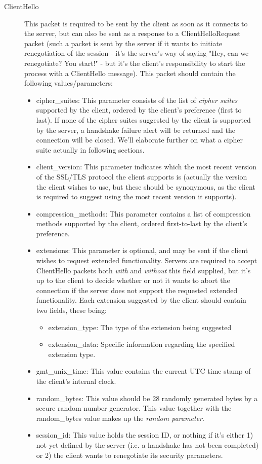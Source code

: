 \begin{description}
	\item[ClientHello]\cite{rfcClientHello,rfcSSLClientHello} This packet is required to be sent by the client as soon as it connects to the server, but can also be sent as a response to a ClientHelloRequest packet (such a packet is sent by the server if it wants to initiate renegotiation of the session - it's the server's way of saying "Hey, can we renegotiate? You start!" - but it's the client's responsibility to start the process with a ClientHello message). This packet should contain the following values/parameters:
	\begin{itemize}
		\item cipher\_suites: This parameter consists of the list of \textit{cipher suites} supported by the client, ordered by the client's preference (first to last). If none of the cipher suites suggested by the client is supported by the server, a handshake failure alert will be returned and the connection will be closed. We'll elaborate further on what a cipher suite actually in following sections.
		\item client\_version: This parameter indicates which the most recent version of the SSL/TLS protocol the client supports is (actually the version the client wishes to use, but these should be synonymous, as the client is required to suggest using the most recent version it supports).
		\item compression\_methods: This parameter contains a list of compression methods supported by the client, ordered first-to-last by the client's preference.
		\item extensions: This parameter is optional, and may be sent if the client wishes to request extended functionality. Servers are required to accept ClientHello packets both \textit{with} and \textit{without} this field supplied, but it's up to the client to decide whether or not it wants to abort the connection if the server does not support the requested extended functionality. Each extension suggested by the client should contain two fields, these being:
		\begin{itemize}
			\item extension\_type: The type of the extension being suggested
			\item extension\_data: Specific information regarding the specified extension type.
		\end{itemize}
		\item gmt\_unix\_time: This value contains the current UTC time stamp of the client's internal clock.
		\item random\_bytes: This value should be 28 randomly generated bytes by a secure random number generator. This value together with the random\_bytes value makes up the \textit{random parameter}.
		\item session\_id: This value holds the session ID, or nothing if it's either 1) not yet defined by the server (i.e. a handshake has not been completed) or 2) the client wants to renegotiate its security parameters.
	\end{itemize}
	

\end{description}
